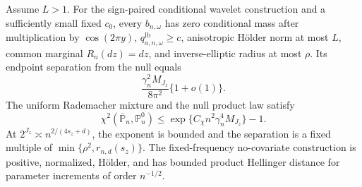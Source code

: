 Assume \(L>1\). For the sign-paired conditional wavelet construction and a sufficiently small fixed \(c_0\), every \(b_{n,\omega}\) has zero conditional mass after multiplication by \(\cos(2\pi y)\), \(q_{a,n,\omega}^{\mathrm{lb}}\ge c\), anisotropic H\"older norm at most \(L\), common marginal \(R_n(dz)=dz\), and inverse-elliptic radius at most \(\rho\). Its endpoint separation from the null equals
\[
\frac{\gamma_n^2M_{J_z}}{8\pi^2}\{1+o(1)\}.
\]
The uniform Rademacher mixture and the null product law satisfy
\[
\chi^2(\overline{\mathbb P}_n,\mathbb P_n^0)\le\exp\{C_{\chi}n^2\gamma_n^4M_{J_z}\}-1.
\]
At \(2^{J_z}\asymp n^{2/(4s_z+d)}\), the exponent is bounded and the separation is a fixed multiple of \(\min\{\rho^2,r_{n,d}(s_z)\}\). The fixed-frequency no-covariate construction is positive, normalized, H\"older, and has bounded product Hellinger distance for parameter increments of order \(n^{-1/2}\).